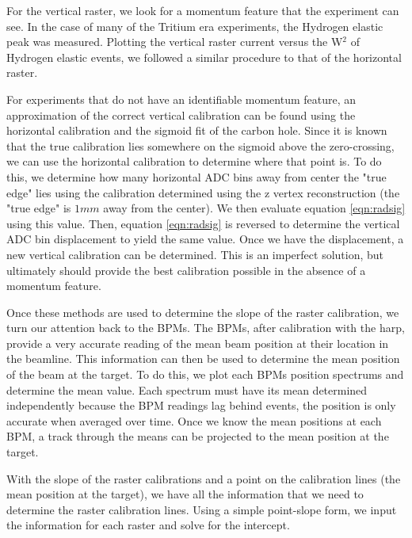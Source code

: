 For the vertical raster, we look for a momentum feature that the experiment can see. In the case of many of the Tritium era experiments, the Hydrogen elastic peak was measured. Plotting the vertical raster current versus the W$^2$ of Hydrogen elastic events, we followed a similar procedure to that of the horizontal raster.

For experiments that do not have an identifiable momentum feature, an approximation of the correct vertical calibration can be found using the horizontal calibration and the sigmoid fit of the carbon hole. Since it is known that the true calibration lies somewhere on the sigmoid above the zero-crossing, we can use the horizontal calibration to determine where that point is. To do this, we determine how many horizontal ADC bins away from center the "true edge" lies using the calibration determined using the z vertex reconstruction (the "true edge" is $1mm$ away from the center). We then evaluate equation \ref{eqn:radsig} using this value. Then, equation \ref{eqn:radsig} is reversed to determine the vertical ADC bin displacement to yield the same value. Once we have the displacement, a new vertical calibration can be determined. This is an imperfect solution, but ultimately should provide the best calibration possible in the absence of a momentum feature.

Once these methods are used to determine the slope of the raster calibration, we turn our attention back to the BPMs. The BPMs, after calibration with the harp, provide a very accurate reading of the mean beam position at their location in the beamline. This information can then be used to determine the mean position of the beam at the target. To do this, we plot each BPMs position spectrums and determine the mean value. Each spectrum must have its mean determined independently because the BPM readings lag behind events, the position is only accurate when averaged over time. Once we know the mean positions at each BPM, a track through the means can be projected to the mean position at the target.

With the slope of the raster calibrations and a point on the calibration lines (the mean position at the target), we have all the information that we need to determine the raster calibration lines. Using a simple point-slope form, we input the information for each raster and solve for the intercept.